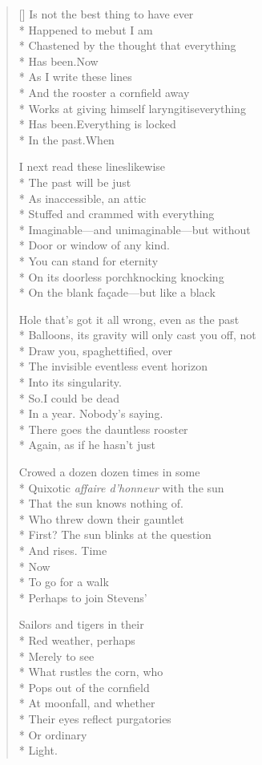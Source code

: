 \label{ch:lung_cancer}
\settowidth{\versewidth}{Works at giving himself laryngitis       everything}
\begin{verse}[\versewidth]
Is not the best thing to have ever\\*
Happened to me\qquad but I am\\*
Chastened by the thought that everything\\*
Has been.\qquad Now\\*
As I write these lines\\*
And the rooster a cornfield away\\*
Works at giving himself laryngitis\qquad everything\\*
Has been.\qquad Everything is locked\\*
In the past.\qquad When

I next read these lines\qquad likewise\\*
The past will be just\\*
As inaccessible, an attic\\*
Stuffed and crammed with everything\\*
Imaginable---and unimaginable---but without\\*
Door or window of any kind.\\*
You can stand for eternity\\*
On its doorless porch\qquad knocking knocking\\*
On the blank façade---but like a black

Hole that's got it all wrong, even as the past\\*
Balloons, its gravity will only cast you off, not\\*
Draw you, spaghettified, over\\*
The invisible eventless event horizon\\*
Into its singularity.\\*
So.\qquad I could be dead\\*
In a year. Nobody's saying.\\*
There goes the dauntless rooster\\*
Again, as if he hasn't just

Crowed a dozen dozen times in some\\*
Quixotic \textit{affaire d'honneur} with the sun\\*
That the sun knows nothing of.\\*
Who threw down their gauntlet\\*
First? The sun blinks at the question\\*
And rises. Time\\*
Now\\*
To go for a walk\\*
Perhaps to join Stevens'

Sailors and tigers in their\\*
Red weather, perhaps\\*
Merely to see\\*
What rustles the corn, who\\*
Pops out of the cornfield\\*
At moonfall, and whether\\*
Their eyes reflect purgatories\\*
Or ordinary\\*
Light.
\end{verse}
